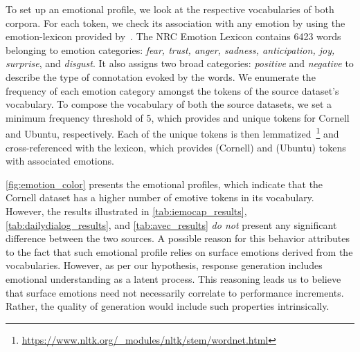 \documentclass[preprint,3pt]{elsarticle}
\begin{document}
To set up an emotional profile, we look at the respective vocabularies of both corpora. For each token, we check its association with any emotion by using the emotion-lexicon provided by~\citet{mohammad2013crowdsourcing}. The NRC Emotion Lexicon contains 6423 words belonging to emotion categories: \textit{fear, trust, anger, sadness, anticipation, joy, surprise}, and \textit{disgust}. It also assigns two broad categories: \textit{positive} and \textit{negative} to describe the type of connotation evoked by the words. We enumerate the frequency of each emotion category amongst the tokens of the source dataset's vocabulary. To compose the vocabulary of both the source datasets, we set a minimum frequency threshold of 5, which provides  and  unique tokens for Cornell and Ubuntu, respectively. Each of the unique tokens is then lemmatized~\footnote{\protect\url{https://www.nltk.org/_modules/nltk/stem/wordnet.html}} and cross-referenced with the lexicon, which provides  (Cornell) and  (Ubuntu) tokens with associated emotions.

\cref{fig:emotion_color} presents the emotional profiles,  which indicate that the Cornell dataset has a higher number of emotive tokens in its vocabulary. However, the results illustrated in \cref{tab:iemocap_results}, \ref{tab:dailydialog_results}, and \ref{tab:avec_results} \textit{do not} present any significant difference between the two sources. A possible reason for this behavior attributes to the fact that such emotional profile relies on surface emotions derived from the vocabularies. However, as per our hypothesis, response generation includes emotional understanding as a latent process. This reasoning leads us to believe that surface emotions need not necessarily correlate to performance increments. Rather, the quality of generation would include such properties intrinsically.
\end{document}
